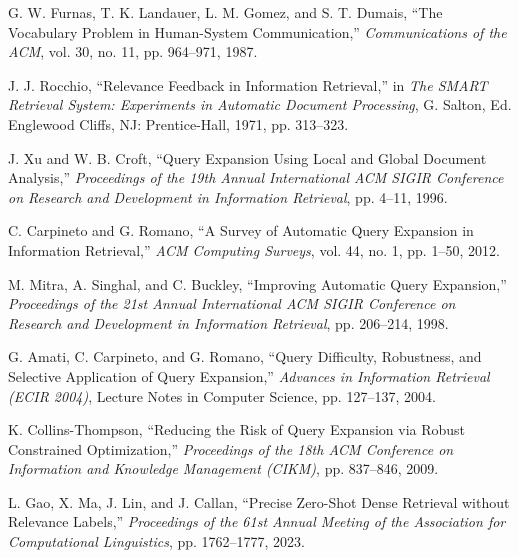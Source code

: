 
G. W. Furnas, T. K. Landauer, L. M. Gomez, and S. T. Dumais,
``The Vocabulary Problem in Human-System Communication,''
\textit{Communications of the ACM},
vol. 30, no. 11, pp. 964--971, 1987.

J. J. Rocchio,
``Relevance Feedback in Information Retrieval,''
in \textit{The SMART Retrieval System: Experiments in Automatic Document
Processing}, G. Salton, Ed. Englewood Cliffs, NJ: Prentice-Hall, 1971,
pp. 313--323.

J. Xu and W. B. Croft,
``Query Expansion Using Local and Global Document Analysis,''
\textit{Proceedings of the 19th Annual International ACM SIGIR Conference on
Research and Development in Information Retrieval},
pp. 4--11, 1996.

C. Carpineto and G. Romano,
``A Survey of Automatic Query Expansion in Information Retrieval,''
\textit{ACM Computing Surveys},
vol. 44, no. 1, pp. 1--50, 2012.

M. Mitra, A. Singhal, and C. Buckley,
``Improving Automatic Query Expansion,''
\textit{Proceedings of the 21st Annual International ACM SIGIR Conference on
Research and Development in Information Retrieval},
pp. 206--214, 1998.

G. Amati, C. Carpineto, and G. Romano,
``Query Difficulty, Robustness, and Selective Application of Query Expansion,''
\textit{Advances in Information Retrieval (ECIR 2004)},
Lecture Notes in Computer Science, pp. 127--137, 2004.

K. Collins-Thompson,
``Reducing the Risk of Query Expansion via Robust Constrained Optimization,''
\textit{Proceedings of the 18th ACM Conference on Information and Knowledge
Management (CIKM)},
pp. 837--846, 2009.

L. Gao, X. Ma, J. Lin, and J. Callan,
``Precise Zero-Shot Dense Retrieval without Relevance Labels,''
\textit{Proceedings of the 61st Annual Meeting of the Association for
Computational Linguistics},
pp. 1762--1777, 2023.

